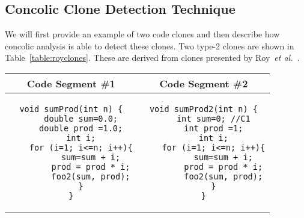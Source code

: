 \documentclass[smallextended]{svjour3}       %
\begin{document}
\subsection{Concolic Clone Detection Technique}
We will first provide an example of two code clones and then describe how concolic analysis is able to detect these clones. Two type-2 clones are shown in Table~\ref{table:royclones}. These are derived from clones presented by Roy~\emph{et al.}~\cite{Roy:2009:CEC:1530898.1531101}.





\noindent
\begin{table*}
\centering
\begin{tabular}{c | c}
\bfseries Code Segment \#1  & \bfseries Code Segment \#2 \\ \hline \hline
\begin{lstlisting}
void sumProd(int n) {
	double sum=0.0;
	double prod =1.0;
	int i;
	for (i=1; i<=n; i++){
		sum=sum + i;
		prod = prod * i;
		foo2(sum, prod);
	}
}
\end{lstlisting}
&
\begin{lstlisting}
void sumProd2(int n) {
	int sum=0; //C1
	int prod =1;
	int i;
	for (i=1; i<=n; i++){
		sum=sum + i;
		prod = prod * i;
		foo2(sum, prod);
	}
}
\end{lstlisting}

\end{tabular}
\caption{An Example of Type-2 clones from Roy~\label{table:royclones}}
\end{table*}
\end{document}
